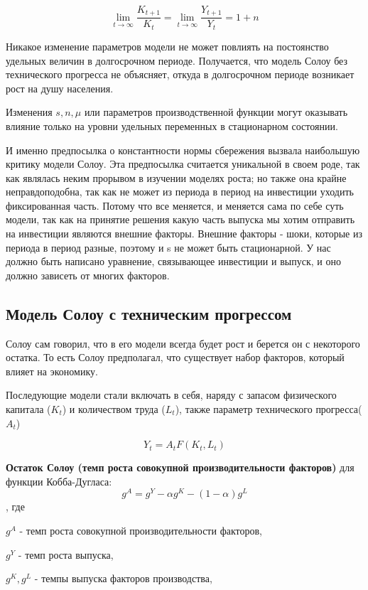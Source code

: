 \documentclass[reqno]{article}
\theoremstyle{definition}
\theoremstyle{definition}
\theoremstyle{definition}
\theoremstyle{definition}
\theoremstyle{definition}
\theoremstyle{definition}
\theoremstyle{definition}
\theoremstyle{definition}
\theoremstyle{definition}
\begin{document}
		$$\lim_{t \rightarrow \infty} \frac{K_{t+1}}{K_t} = \lim_{t \rightarrow \infty} \frac{Y_{t+1}}{Y_t} = 1 + n$$
		
		Никакое изменение параметров модели не может повлиять на постоянство удельных величин в долгосрочном периоде. Получается, что модель Солоу без технического прогресса не объясняет, откуда в долгосрочном периоде возникает рост на душу населения.
		
		Изменения $s, n, \mu$ или параметров производственной функции могут оказывать влияние только на уровни удельных переменных в стационарном состоянии.
		
		И именно предпосылка о константности нормы сбережения вызвала наибольшую критику модели Солоу. Эта предпосылка считается уникальной в своем роде, так как являлась неким прорывом в изучении моделях роста; но также она крайне неправдоподобна, так как не может из периода в период на инвестиции уходить фиксированная часть. Потому что все меняется, и меняется сама по себе суть модели, так как на принятие решения какую часть выпуска мы хотим отправить на инвестиции являются внешние факторы. Внешние факторы - шоки, которые из периода в период разные, поэтому и s не может быть стационарной. У нас должно быть написано уравнение, связывающее инвестиции и выпуск, и оно должно зависеть от многих факторов.
		
		\subsection{Модель Солоу с техническим прогрессом}
		
		Солоу сам говорил, что в его модели всегда будет рост и берется он с некоторого остатка. То есть Солоу предполагал, что существует набор факторов, который влияет на экономику.
		
		Последующие модели стали включать в себя, наряду с запасом физического капитала ($K_t$) и количеством труда ($L_t$), также параметр технического прогресса($A_t$)
		
		$$Y_t = A_t F(K_t,L_t)$$
		
		\textbf{Остаток Солоу (темп роста совокупной производительности факторов)} для функции Кобба-Дугласа:
		$$g^A = g^Y - \alpha g^K - (1 - \alpha) g^L$$
		, где
		
		$g^A$ - темп роста совокупной производительности факторов,
		
		$g^Y$ - темп роста выпуска,
		
		$g^K, g^L$ - темпы выпуска факторов производства,
		
\end{document}
